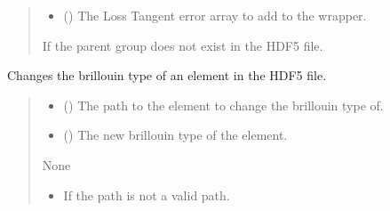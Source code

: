 \documentclass[letterpaper,10pt,english]{sphinxmanual}
\begin{document}
\begin{fulllineitems}
\begin{fulllineitems}
\begin{quote}
\begin{description}
\begin{itemize}
\item {} 
\sphinxAtStartPar
{} (\sphinxstyleliteralemphasis{\sphinxupquote{, }}) \textendash{} The Loss Tangent error array to add to the wrapper.

\end{itemize}

\sphinxAtStartPar
{} \textendash{} If the parent group does not exist in the HDF5 file.

\end{description}\end{quote}

\end{fulllineitems}


\begin{fulllineitems}
\label{\detokenize{_autosummary/HDF5_BLS.wrapper:HDF5_BLS.wrapper.Wrapper.change_brillouin_type}}
\pysigstartsignatures
\pysiglinewithargsret
{}
{\sphinxparamcomma {}}
{}
\pysigstopsignatures
\sphinxAtStartPar
Changes the brillouin type of an element in the HDF5 file.
\begin{quote}\begin{description}
\begin{itemize}
\item {} 
\sphinxAtStartPar
{} () \textendash{} The path to the element to change the brillouin type of.

\item {} 
\sphinxAtStartPar
{} () \textendash{} The new brillouin type of the element.

\end{itemize}

\sphinxAtStartPar
None

\begin{itemize}
\item {} 
\sphinxAtStartPar
{} \textendash{} If the path is not a valid path.


\end{itemize}
\end{description}
\end{quote}
\end{fulllineitems}
\end{fulllineitems}
\end{document}
